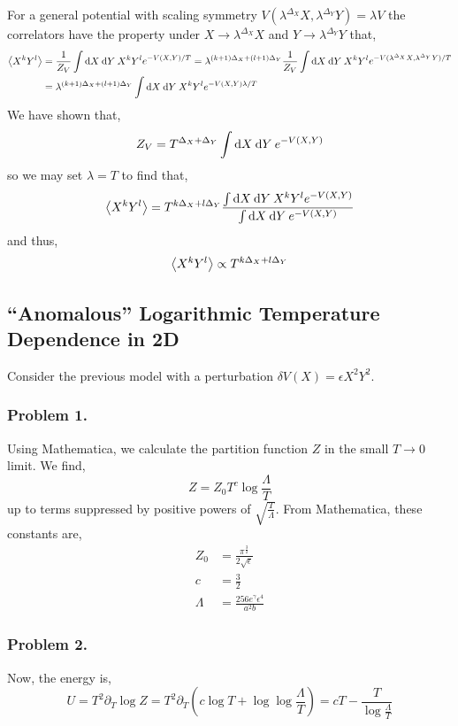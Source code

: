 \documentclass[12pt]{article}
\begin{document}
For a general potential with scaling symmetry $V(\lambda^{\Delta_X} X, \lambda^{\Delta_Y} Y) = \lambda V$ the correlators have the property under $X \to \lambda^{\Delta_X} X$ and $Y \to \lambda^{\Delta_Y} Y$ that,
\begin{align*}
\left< X^k Y^l \right> & = \frac{1}{Z_V} \int \mathrm{d}X \: \mathrm{d}Y \: X^k Y^l e^{-V(X, Y) / T} = \lambda^{(k + 1) \Delta_X + (l + 1) \Delta_Y} \frac{1}{Z_V} \int \mathrm{d}X \: \mathrm{d}Y \: X^k Y^l e^{-V(\lambda^{\Delta_X} X, \lambda^{\Delta_Y} Y) / T} 
\\
& =  \lambda^{(k + 1) \Delta_X + (l + 1) \Delta_Y} \int \mathrm{d}X \: \mathrm{d}Y \: X^k Y^l e^{-V(X, Y) \lambda / T}
\end{align*}
We have shown that,
\begin{align*}
Z_V = T^{\Delta_X + \Delta_Y} \int \mathrm{d}X \: \mathrm{d}Y \: e^{-V(X,Y)}
\end{align*}
so we may set $\lambda = T$ to find that,
\[ \left< X^k Y^l \right> = T^{k \Delta_X + l \Delta_Y} \frac{\int \mathrm{d}X \: \mathrm{d}Y \: X^k Y^l e^{-V(X, Y)}}{\int \mathrm{d}X \: \mathrm{d}Y \: e^{-V(X,Y)}} \]
and thus,
\[ \left< X^k Y^l \right> \propto T^{k \Delta_X + l \Delta_Y} \]

\subsection{``Anomalous'' Logarithmic Temperature Dependence in 2D}

Consider the previous model with a perturbation $\delta V(X) = \epsilon X^2 Y^2$.

\subsubsection{Problem 1.}

Using Mathematica, we calculate the partition function $Z$ in the small $T \to 0$ limit. We find,
\[ Z = Z_0 T^c \log{\frac{\Lambda}{T}} \]
up to terms suppressed by positive powers of $\sqrt{\frac{T}{\Lambda}}$. From Mathematica, these constants are,
\begin{align*}
Z_0 & = \frac{\pi^{\frac{3}{2}}}{2\sqrt{\epsilon}}
\\
c & = \frac{3}{2}
\\
\Lambda & = \frac{256 e^{\gamma} \epsilon^4}{a^2 b} 
\end{align*} 

\subsubsection{Problem 2.}

Now, the energy is,
\[ U = T^2 \partial_T \log{Z} = T^2 \partial_T \left( c \log{T} + \log{\log{\frac{\Lambda}{T}}} \right) = c T - \frac{T}{\log{\frac{\Lambda}{T}}} \]
\end{document}
